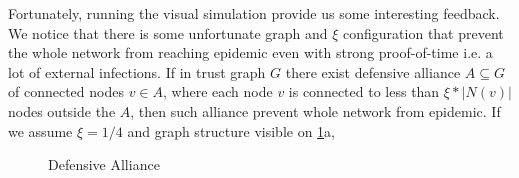 \documentclass[nostrict]{szablonPG}
\begin{document}
Fortunately, running the visual simulation provide us some interesting feedback. We notice that there is some unfortunate graph and $\xi$ configuration that prevent the whole network from reaching epidemic even with strong proof-of-time i.e. a lot of external infections.
If in trust graph $G$ there exist defensive alliance $A \subseteq G$ of connected nodes $v \in A$, where each node $v$ is connected to less than $\xi * |N(v)|$ nodes outside the $A$, then such alliance prevent whole network from epidemic. If we assume $\xi = 1/4$ and graph structure visible on \ref{fig:defensive-alliance}a,
\begin{figure}[h!]
 \hfill 	
\caption{Defensive Alliance}
\label{fig:defensive-alliance}
\end{figure}
\end{document}
